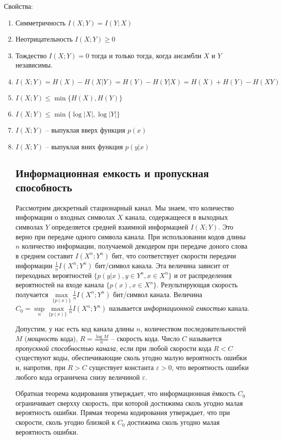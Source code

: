\documentclass[a4paper,12pt]{article}
\begin{document}
Свойства:
\begin{enumerate}
\item Симметричность $I(X;Y)=I(Y;X)$
\item Неотрицательность $I(X;Y) \ge 0$
\item Тождество $I(X;Y)=0$ тогда и только тогда, когда ансамбли $X$ и $Y$ независимы.
\item $I(X;Y)=H(X)-H(X|Y)=H(Y)-H(Y|X)=H(X)+H(Y)-H(XY)$
\item $I(X;Y)\le\min\{H(X),H(Y)\}$
\item $I(X;Y)\le\min\{\log|X|,\log|Y|\}$
\item $I(X;Y)$ -- выпуклая вверх функция $p(x)$
\item $I(X;Y)$ -- выпуклая вних функция $p(y|x)$

\subsection*{Информационная емкость и пропускная способность}
Рассмотрим дискретный стационарный канал. Мы знаем, что количество информации о входных символах $X$ канала, содержащееся в выходных символах $Y$ определяется средней взаимной информацией $I(X;Y)$. Это верно при передаче одного символа канала. При использовании кодов длины $n$ количество информации, получаемой декодером при передаче доного слова в среднем составит $I(X^n;Y^n)$ бит, что соответствует скорости передачи информации $\frac{1}{n}I(X^n;Y^n)$ бит/символ канала. Эта величина зависит от переходных вероятностей $\{p(y|x), y\in Y^n,x\in X^n\}$ и от распределения вероятностей на входе канала $\{p(x),x\in X^n\}$. Результирующая скорость получается $\max\limits_{\{p(x)\}}\frac{1}{n}I(X^n;Y^n)$ бит/символ канала. Величина $C_0=\sup\limits_n\max\limits_{\{p(x)\}}\frac{1}{n}I(X^n;Y^n)$ называется \textit{информационной емкостью} канала.

Допустим, у нас есть код канала длины $n$, количеством последовательностей $M$ (\textit{мощность} кода), $R=\frac{\log M}{n}$ -- скорость кода. Число $C$ называется \textit{пропускной способностью канала}, если при любой скорости кода $R<C$ существуют коды, обеспечивающие сколь угодно малую вероятность ошибки и, напротив, при $R>C$ существует константа $\varepsilon>0$, что вероятность ошибки любого кода ограничена снизу величиной $\varepsilon$.

Обратная теорема кодирования утверждает, что информационная ёмкость $C_0$ ограничивает сверхху скорость, при которой достижима сколь угодно малая вероятность ошибки. Прямая теорема кодирования утверждает, что при скорости, сколь угодно близкой к $C_0$ достижима сколь угодно малая вероятность ошибки. 


\end{enumerate}
\end{document}
